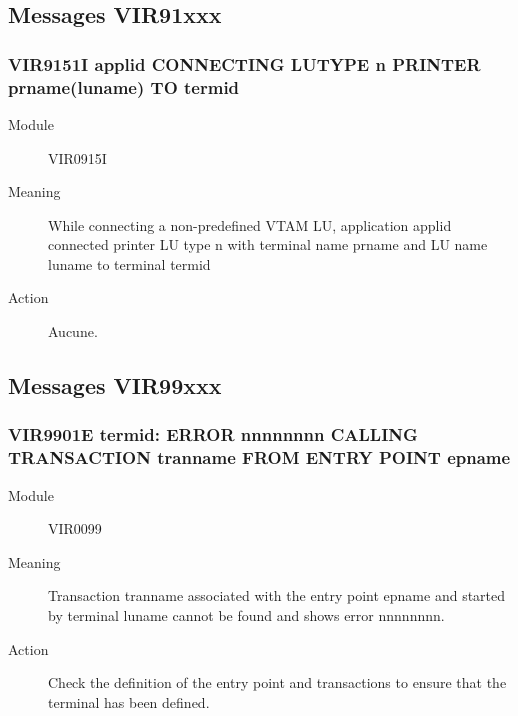 \documentclass[letterpaper,10pt,english]{sphinxmanual}
\begin{document}
\subsection{Messages VIR91xxx}
\label{\detokenize{messages:messages-vir91xxx}}

\subsubsection{VIR9151I applid CONNECTING LUTYPE n PRINTER prname(luname) TO termid}
\label{\detokenize{messages:vir9151i-applid-connecting-lutype-n-printer-prname-luname-to-termid}}\begin{description}
\item[{Module}] \leavevmode
VIR0915I

\item[{Meaning}] \leavevmode
While connecting a non-predefined VTAM LU, application applid connected printer LU type n with terminal name prname and LU name luname to terminal termid

\item[{Action}] \leavevmode
Aucune.

\end{description}


\subsection{Messages VIR99xxx}
\label{\detokenize{messages:messages-vir99xxx}}

\subsubsection{VIR9901E termid: ERROR nnnnnnnn CALLING TRANSACTION tranname FROM ENTRY POINT epname}
\label{\detokenize{messages:vir9901e-termid-error-nnnnnnnn-calling-transaction-tranname-from-entry-point-epname}}\begin{description}
\item[{Module}] \leavevmode
VIR0099

\item[{Meaning}] \leavevmode
Transaction tranname associated with the entry point epname and started by terminal luname cannot be found and shows error nnnnnnnn.

\item[{Action}] \leavevmode
Check the definition of the entry point and transactions to ensure that the terminal has been defined.

\end{description}
\end{document}
